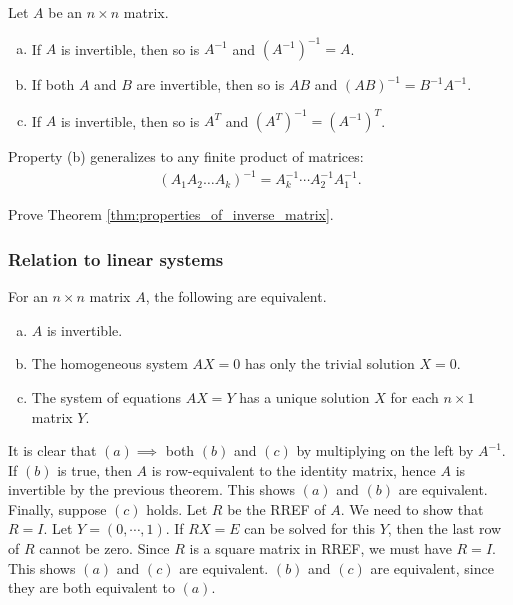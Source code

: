 \documentclass[12pt,letterpaper,reqno]{article}
\numberwithin{equation}{section}
\begin{document}
\begin{thm}[Properties of $A^{-1}$]\label{thm:properties_of_inverse_matrix}
   Let $A$ be an $n \times n$ matrix.
    \begin{enumerate}[(a)]
        \item If $A$ is invertible, then so is $A^{-1}$ and $(A^{-1})^{-1}=A$.
        \item If both $A$ and $B$ are invertible, then so is $AB$ and $(AB)^{-1}=B^{-1}A^{-1}$.
        \item If $A$ is invertible, then so is $A^T$ and $(A^T)^{-1}=(A^{-1})^T$.
    \end{enumerate}  
    Property (b) generalizes to any finite product of matrices:
    \begin{align*}
        (A_1A_2\dots A_k)^{-1}=A_k^{-1}\cdots A_2^{-1} A_1^{-1}.
    \end{align*}
\end{thm}

\begin{exercise}
    Prove Theorem \ref{thm:properties_of_inverse_matrix}.
\end{exercise}

\subsubsection{Relation to linear systems}
\begin{thm} \label{thm:solution_sets_n_equations_n_unknowns}
		For an $n \times n$ matrix $A$, the following are equivalent.
	\begin{enumerate}[(a)]
		\item $A$ is invertible.
		\item The homogeneous system $AX=0$ has only the trivial solution $X=0$.
		\item The system of equations $AX=Y$ has a unique solution $X$ for each $n \times 1$ matrix $Y$.
	\end{enumerate}
\end{thm}

\begin{pf}
It is clear that $(a) \implies $ both $(b)$ and $(c)$ by multiplying on the left by $A^{-1}$. If $(b)$ is true, then $A$ is row-equivalent to the identity matrix, hence $A$ is invertible by the previous theorem. This shows $(a)$ and $(b)$ are equivalent. Finally, suppose $(c)$ holds. Let $R$ be the RREF of $A$. We need to show that $R=I$. Let $Y=(0,\cdots,1)$. If $RX=E$ can be solved for this $Y$, then the last row of $R$ cannot be zero. Since $R$ is a square matrix in RREF, we must have $R=I$. This shows $(a)$ and $(c)$ are equivalent. $(b)$ and $(c)$ are equivalent, since they are both equivalent to $(a)$.	
\end{pf}
\end{document}
